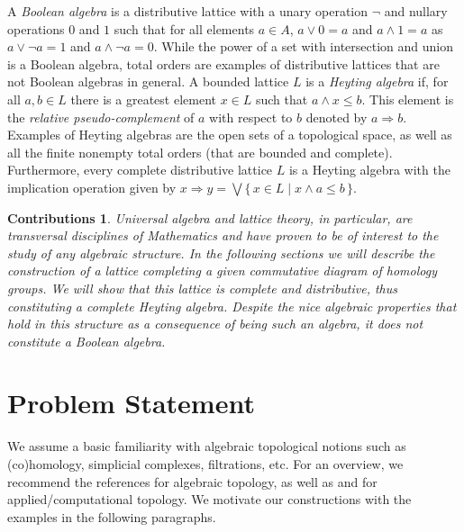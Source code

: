 \documentclass[10pt]{amsart}
\newtheorem{contributions}[theorem]{Contributions}
\newcommand{\set}[1]{\{\,#1\,\}}
\begin{document}
%
A \emph{Boolean algebra} is a distributive lattice with a unary operation $\neg$ 
and nullary operations $0$ and $1$ such that for all elements $a\in A$, $a\vee 0 = a$ and $a\wedge 1=a$ as $a\vee \neg a = 1$ and  $a\wedge \neg a = 0$.
While the power of a set with intersection and union is a Boolean algebra, total orders are examples of distributive lattices that are not Boolean algebras in general.
%
A bounded lattice $L$ is a \emph{Heyting algebra} if, for all $a,b\in  L$ there is a greatest element $x\in L$ such that $a\wedge x\leq b$. This element is the \emph{relative pseudo-complement} of $a$ with respect to $b$ denoted by $a\Rightarrow b$. 
Examples of Heyting algebras are the open sets of a topological space, as well as all the finite nonempty total orders (that are bounded and complete). 
Furthermore, every complete distributive lattice $L$ is a Heyting algebra with the implication operation given by $x \Rightarrow y = \bigvee \set{x\in L \mid x \wedge a \leq b}$. %


\begin{contributions}
Universal algebra and lattice theory, in particular, are transversal disciplines of Mathematics and have proven to be of interest to the study of any algebraic structure. In the following sections we will describe the construction of a lattice completing a given commutative diagram of homology groups. We will show that this lattice is complete and distributive, thus constituting a complete Heyting algebra. Despite the nice algebraic properties that hold in this structure as a consequence of being such an algebra, it does not constitute a Boolean algebra.
\end{contributions} 





%
\section{Problem Statement}
\label{Problem Statement}


We assume a basic familiarity with algebraic topological notions such as (co)homology, simplicial complexes, filtrations, etc. 
For an overview, we recommend the references \cite{Hat00} for algebraic topology, as well as \cite{Ed10} and \cite{Zom05} for applied/computational
topology.
We motivate our constructions with the examples in the following paragraphs.
\end{document}
